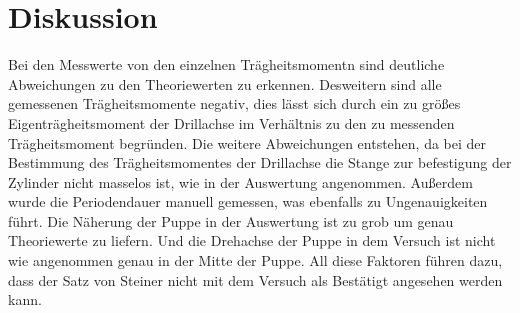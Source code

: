 \section{Diskussion}
\label{sec:Diskussion}
Bei den Messwerte von den einzelnen Trägheitsmomentn sind deutliche Abweichungen
zu den Theoriewerten zu erkennen. Desweitern sind alle gemessenen Trägheitsmomente negativ, dies lässt sich durch ein zu größes Eigenträgheitsmoment der Drillachse im Verhältnis
zu den zu messenden Trägheitsmoment begründen. Die weitere Abweichungen entstehen, da bei
der Bestimmung des Trägheitsmomentes der Drillachse die Stange zur befestigung der
Zylinder nicht masselos ist, wie in der Auswertung angenommen. Außerdem wurde die
Periodendauer manuell gemessen, was ebenfalls zu Ungenauigkeiten führt.
Die Näherung der Puppe in der Auswertung ist zu grob um genau Theoriewerte zu liefern.
Und die Drehachse der Puppe in dem Versuch ist nicht wie angenommen genau in der Mitte der Puppe.
All diese Faktoren führen dazu, dass der Satz von Steiner nicht mit dem Versuch als Bestätigt
angesehen werden kann.
